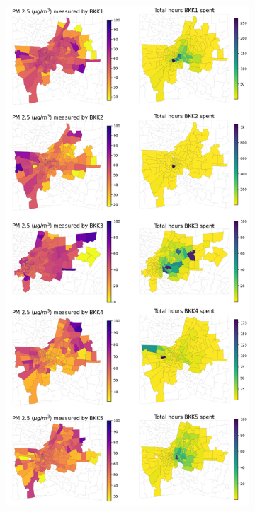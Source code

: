 \begin{figure}[t]
    \centering

    \begin{subfigure}[t]{0.49\textwidth}
        \centering
        \includegraphics[width=\linewidth]{figures/map/BKK_PM_TIME.png}%

\end{subfigure}
\end{figure}
